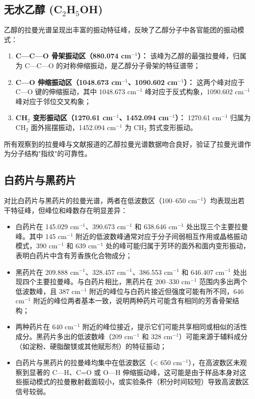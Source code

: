\subsection{无水乙醇 (C$_2$H$_5$OH)}

乙醇的拉曼光谱呈现出丰富的振动特征峰，反映了乙醇分子中各官能团的振动模式：
\begin{enumerate}[label=(\arabic*), leftmargin=3em]
    \item \textbf{C—C—O 骨架振动区（880.074 cm$^{-1}$）：} 该峰为乙醇的最强拉曼峰，归属为 C—C—O 的对称伸缩振动，是乙醇分子骨架的特征谱带；
    \item \textbf{C—O 伸缩振动区（1048.673 cm$^{-1}$、1090.602 cm$^{-1}$）：} 这两个峰对应于 C—O 键的伸缩振动，其中 1048.673 cm$^{-1}$ 峰对应于反式构象，1090.602 cm$^{-1}$ 峰对应于邻位交叉构象；
    \item \textbf{CH$_2$ 变形振动区（1270.61 cm$^{-1}$、1452.094 cm$^{-1}$）：} 1270.61 cm$^{-1}$ 归属为 CH$_2$ 面外摇摆振动，1452.094 cm$^{-1}$ 为 CH$_2$ 剪式变形振动。
\end{enumerate}

\noindent 所有观察到的拉曼峰与文献报道的乙醇拉曼光谱数据吻合良好，验证了拉曼光谱作为分子结构"指纹"的可靠性。

\subsection{白药片与黑药片}

对比白药片与黑药片的拉曼光谱，两者在低波数区（100--650 cm$^{-1}$）均表现出若干特征峰，但峰位和峰数存在明显差异：
\begin{itemize}
    \item 白药片在 145.029 cm$^{-1}$、390.673 cm$^{-1}$ 和 638.646 cm$^{-1}$ 处出现三个主要拉曼峰。其中 145 cm$^{-1}$ 附近的低波数峰通常对应于分子间弱相互作用或晶格振动模式，390 cm$^{-1}$ 和 639 cm$^{-1}$ 处的峰可能归属于芳环的面外和面内变形振动，表明白药片中含有芳香族化合物成分；
    \item 黑药片在 209.888 cm$^{-1}$、328.457 cm$^{-1}$、386.553 cm$^{-1}$ 和 646.407 cm$^{-1}$ 处出现四个主要拉曼峰。与白药片相比，黑药片在 200--330 cm$^{-1}$ 范围内多出两个低波数峰，且 387 cm$^{-1}$ 附近的峰位与白药片接近但强度可能有所不同，646 cm$^{-1}$ 附近的峰位两者基本一致，说明两种药片可能含有相同的芳香骨架结构；
    \item 两种药片在 640 cm$^{-1}$ 附近的峰位接近，提示它们可能共享相同或相似的活性成分。黑药片多出的低波数峰（209 cm$^{-1}$ 和 328 cm$^{-1}$）可能来源于辅料成分（如淀粉、硬脂酸镁或其他赋形剂）的特征振动；
    \item 白药片与黑药片的拉曼峰均集中在低波数区（< 650 cm$^{-1}$），在高波数区未观察到显著的 C—H、C=O 或 O—H 伸缩振动峰，这可能是由于样品本身对这些振动模式的拉曼散射截面较小，或实验条件（积分时间较短）导致高波数区信号较弱。
\end{itemize}

